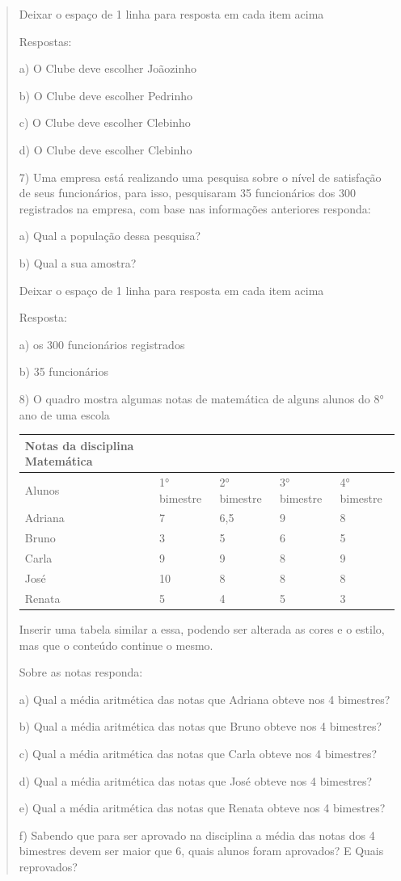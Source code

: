 \begin{quote}
\begin{escolha}
Deixar o espaço de 1 linha para resposta em cada item acima

Respostas:

a) O Clube deve escolher Joãozinho

b) O Clube deve escolher Pedrinho

c) O Clube deve escolher Clebinho

d) O Clube deve escolher Clebinho

7) Uma empresa está realizando uma pesquisa sobre o nível de satisfação
de seus funcionários, para isso, pesquisaram 35 funcionários dos 300
registrados na empresa, com base nas informações anteriores responda:

a) Qual a população dessa pesquisa?

b) Qual a sua amostra?

Deixar o espaço de 1 linha para resposta em cada item acima

Resposta:

a) os 300 funcionários registrados

b) 35 funcionários

8) O quadro mostra algumas notas de matemática de alguns alunos do 8°
ano de uma escola

\begin{longtable}[]{@{}lllll@{}}
\toprule
Notas da disciplina Matemática & & & &\tabularnewline
\midrule
\endhead
Alunos & 1° bimestre & 2° bimestre & 3° bimestre & 4°
bimestre\tabularnewline
Adriana & 7 & 6,5 & 9 & 8\tabularnewline
Bruno & 3 & 5 & 6 & 5\tabularnewline
Carla & 9 & 9 & 8 & 9\tabularnewline
José & 10 & 8 & 8 & 8\tabularnewline
Renata & 5 & 4 & 5 & 3\tabularnewline
\bottomrule
\end{longtable}

Inserir uma tabela similar a essa, podendo ser alterada as cores e o
estilo, mas que o conteúdo continue o mesmo.

Sobre as notas responda:

a) Qual a média aritmética das notas que Adriana obteve nos 4 bimestres?

b) Qual a média aritmética das notas que Bruno obteve nos 4 bimestres?

c) Qual a média aritmética das notas que Carla obteve nos 4 bimestres?

d) Qual a média aritmética das notas que José obteve nos 4 bimestres?

e) Qual a média aritmética das notas que Renata obteve nos 4 bimestres?

f) Sabendo que para ser aprovado na disciplina a média das notas dos 4
bimestres devem ser maior que 6, quais alunos foram aprovados? E Quais
reprovados?


\end{escolha}
\end{quote}
